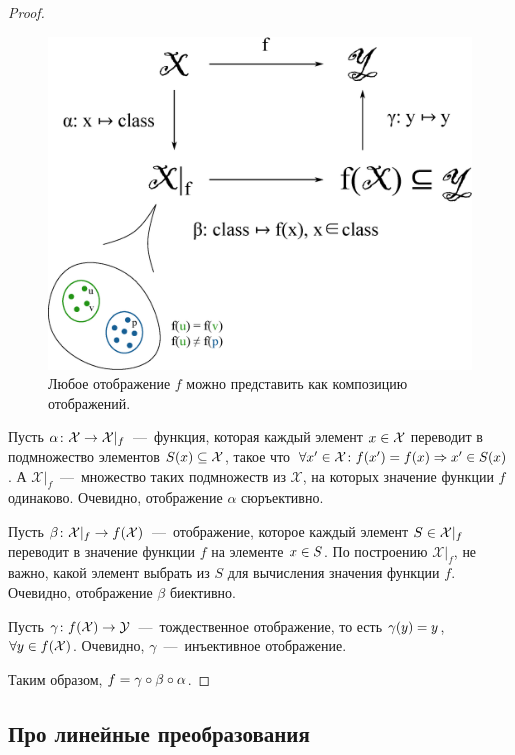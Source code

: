 \documentclass[a4paper,12pt]{article}
\begin{document}
  \begin{proof}
    \begin{figure}
      \centering
      
      \includegraphics[width=0.8\columnwidth]{tribute-to-algebraic-approach}
      
      \caption{Любое отображение $f$ можно представить как композицию отображений.}
      \label{fig:tribute-to-algebraic}
    \end{figure}
    
    Пусть $\alpha\colon \mathcal X \hm\to \mathcal X|_f$~---~функция, которая каждый элемент $x \hm\in \mathcal X$ переводит в подмножество элементов $S(x) \hm\subseteq \mathcal X$, такое что $\forall x' \hm\in \mathcal X\colon f(x') \hm= f(x) \hm\Rightarrow x' \hm\in S(x)$.
    А $\mathcal X|_f$~---~множество таких подмножеств из $\mathcal X$, на которых значение функции $f$ одинаково.
    Очевидно, отображение $\alpha$ сюръективно.
    
    Пусть $\beta\colon \mathcal X|_f \hm\to f(\mathcal X)$~---~отображение, которое каждый элемент $S \hm\in \mathcal X|_f$ переводит в значение функции $f$ на элементе $x \hm\in S$.
    По построению $\mathcal X|_f$, не важно, какой элемент выбрать из $S$ для вычисления значения функции $f$.
    Очевидно, отображение $\beta$ биективно.
    
    Пусть $\gamma\colon f(\mathcal X) \hm\to \mathcal Y$~---~тождественное отображение, то есть $\gamma(y) \hm= y$, $\forall y \hm\in f(\mathcal X)$.
    Очевидно, $\gamma$~---~инъективное отображение.
    
    Таким образом, $f \hm= \gamma \circ \beta \circ \alpha$.
  \end{proof}
  
  
  \subsection{Про линейные преобразования}
  
\end{document}

